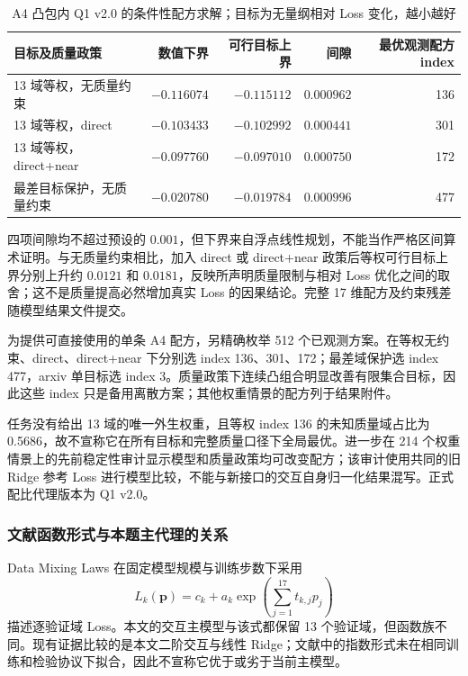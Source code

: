 \begin{table}[htbp]
\centering\small
\caption{A4 凸包内 Q1 v2.0 的条件性配方求解；目标为无量纲相对 Loss 变化，越小越好}
\label{tab:q1_decision_bounds}
\begin{tabular}{lrrrr}
\toprule
目标及质量政策 & 数值下界 & 可行目标上界 & 间隙 & 最优观测配方 index \\
\midrule
13 域等权，无质量约束 & $-0.116074$ & $-0.115112$ & $0.000962$ & 136 \\
13 域等权，direct & $-0.103433$ & $-0.102992$ & $0.000441$ & 301 \\
13 域等权，direct+near & $-0.097760$ & $-0.097010$ & $0.000750$ & 172 \\
最差目标保护，无质量约束 & $-0.020780$ & $-0.019784$ & $0.000996$ & 477 \\
\bottomrule
\end{tabular}
\end{table}

四项间隙均不超过预设的 $0.001$，但下界来自浮点线性规划，不能当作严格区间算术证明。与无质量约束相比，加入 direct 或 direct+near 政策后等权可行目标上界分别上升约 $0.0121$ 和 $0.0181$，反映所声明质量限制与相对 Loss 优化之间的取舍；这不是质量提高必然增加真实 Loss 的因果结论。完整 17 维配方及约束残差随模型结果文件提交。

为提供可直接使用的单条 A4 配方，另精确枚举 512 个已观测方案。在等权无约束、direct、direct+near 下分别选 index 136、301、172；最差域保护选 index 477，arxiv 单目标选 index 3。质量政策下连续凸组合明显改善有限集合目标，因此这些 index 只是备用离散方案；其他权重情景的配方列于结果附件。

任务没有给出 13 域的唯一外生权重，且等权 index 136 的未知质量域占比为 0.5686，故不宣称它在所有目标和完整质量口径下全局最优。进一步在 214 个权重情景上的先前稳定性审计显示模型和质量政策均可改变配方；该审计使用共同的旧 Ridge 参考 Loss 进行模型比较，不能与新接口的交互自身归一化结果混写。正式配比代理版本为 Q1 v2.0。
\subsubsection{文献函数形式与本题主代理的关系}

Data Mixing Laws 在固定模型规模与训练步数下采用
\begin{equation}
L_k(\boldsymbol p)
=
c_k+a_k
\exp\left(
\sum_{j=1}^{17}t_{k,j}p_j
\right)
\label{eq:q1_dml_candidate}
\end{equation}
描述逐验证域 Loss\cite{datamixinglaws2025}。本文的交互主模型与该式都保留 13 个验证域，但函数族不同。现有证据比较的是本文二阶交互与线性 Ridge；文献中的指数形式未在相同训练和检验协议下拟合，因此不宣称它优于或劣于当前主模型。

